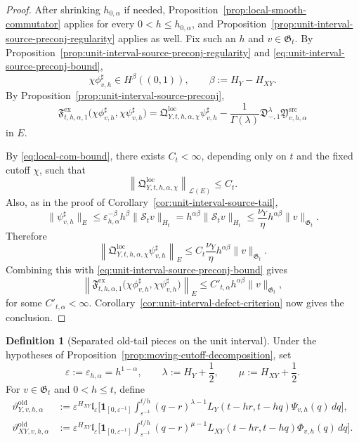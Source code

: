\documentclass[11pt,a4paper]{amsart}
\theoremstyle{plain}
\theoremstyle{definition}
\newtheorem{definition}[theorem]{Definition}
\theoremstyle{remark}
\newcommand{\one}{\mathbf 1}
\begin{document}
\begin{proof}
  After shrinking \(h_{0,\alpha}\) if needed, Proposition~\ref{prop:local-smooth-commutator} applies
  for every \(0<h\le h_{0,\alpha}\), and
  Proposition~\ref{prop:unit-interval-source-preconj-regularity} applies as well. Fix such an \(h\)
  and \(v\in\mathfrak G_t\). By
  Proposition~\ref{prop:unit-interval-source-preconj-regularity} and
  \eqref{eq:unit-interval-source-preconj-bound},
  \[
  \chi\phi_{v,h}^{\sharp}\in H^\beta((0,1)),
  \qquad
  \beta:=H_Y-H_{XY}.
  \]
  By
  Proposition~\ref{prop:unit-interval-source-preconj},
  \[
  \mathfrak F_{t,h,\alpha,1}^{\mathrm{ex}}
  \bigl(
\chi\phi_{v,h}^{\sharp},
\chi\psi_{v,h}^{\sharp}
\bigr)
=
\mathfrak Q_{Y,t,h,\alpha,\chi}^{\mathrm{loc}}\psi_{v,h}^{\sharp}
-
\frac{1}{\Gamma(\lambda)}
\mathfrak D_{-,1}^{\lambda}
\mathfrak Y_{v,h,\alpha}^{\mathrm{src}}
\]
in \(E\).

By \eqref{eq:local-com-bound}, there exists \(C_t<\infty\), depending only on \(t\) and the fixed
cutoff \(\chi\), such that
\[
\left\|
\mathfrak Q_{Y,t,h,\alpha,\chi}^{\mathrm{loc}}
\right\|_{\mathcal L(E)}
\le
C_t.
\]
Also, as in the proof of Corollary~\ref{cor:unit-interval-source-tail},
\[
\|\psi_{v,h}^{\sharp}\|_{E}
\le
\varepsilon_{h,\alpha}^{-\beta}h^\beta\|\mathcal S_t v\|_{H_t}
=
h^{\alpha\beta}\|\mathcal S_t v\|_{H_t}
\le
\frac{\nu_Y}{\eta}h^{\alpha\beta}\|v\|_{\mathfrak G_t}.
\]
Therefore
\[
\left\|
\mathfrak Q_{Y,t,h,\alpha,\chi}^{\mathrm{loc}}\psi_{v,h}^{\sharp}
\right\|_{E}
\le
C_t\frac{\nu_Y}{\eta}h^{\alpha\beta}\|v\|_{\mathfrak G_t}.
\]
Combining this with \eqref{eq:unit-interval-source-preconj-bound} gives
\[
\left\|
\mathfrak F_{t,h,\alpha,1}^{\mathrm{ex}}
\bigl(
\chi\phi_{v,h}^{\sharp},
\chi\psi_{v,h}^{\sharp}
\bigr)
\right\|_{E}
\le
C'_{t,\alpha}h^{\alpha\beta}\|v\|_{\mathfrak G_t},
\]
for some \(C'_{t,\alpha}<\infty\). Corollary~\ref{cor:unit-interval-defect-criterion} now gives the
conclusion.
\end{proof}

\begin{definition}[Separated old-tail pieces on the unit interval]
\label{def:unit-interval-old-tail-split}
Under the hypotheses of Proposition~\ref{prop:moving-cutoff-decomposition}, set
\[
\varepsilon:=\varepsilon_{h,\alpha}=h^{1-\alpha},
\qquad
\lambda:=H_Y+\frac12,
\qquad
\mu:=H_{XY}+\frac12.
\]
For \(v\in\mathfrak G_t\) and \(0<h\le t\), define
\begin{align}
\vartheta_{Y,v,h,\alpha}^{\mathrm{old}}
&:=
\varepsilon^{H_{XY}}
\mathfrak l_{\varepsilon}
\Biggl[
\one_{[0,\varepsilon^{-1}]}
\int_{\varepsilon^{-1}}^{t/h}
(q-r)^{\lambda-1}
L_Y(t-hr,t-hq)\Psi_{v,h}(q)\,dq
\Biggr],
\label{eq:unit-interval-target-old-tail}\\
\vartheta_{XY,v,h,\alpha}^{\mathrm{old}}
&:=
\varepsilon^{H_{XY}}
\mathfrak l_{\varepsilon}
\Biggl[
\one_{[0,\varepsilon^{-1}]}
\int_{\varepsilon^{-1}}^{t/h}
(q-r)^{\mu-1}
L_{XY}(t-hr,t-hq)\Phi_{v,h}(q)\,dq
\Biggr].
\label{eq:unit-interval-source-old-tail}
\end{align}
\end{definition}
\end{document}
